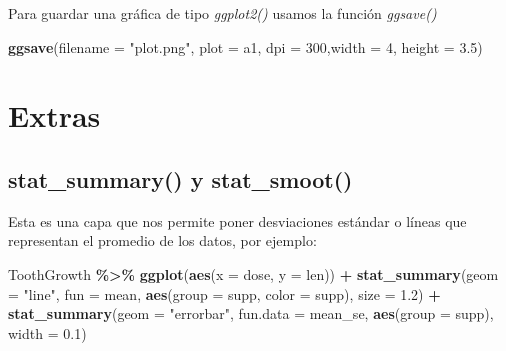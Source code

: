 \documentclass[
]{book}
\newenvironment{Shaded}{\begin{snugshade}}{\end{snugshade}}
\newcommand{\AttributeTok}[1]{\textcolor[rgb]{0.13,0.29,0.53}{#1}}
\newcommand{\DecValTok}[1]{\textcolor[rgb]{0.00,0.00,0.81}{#1}}
\newcommand{\FloatTok}[1]{\textcolor[rgb]{0.00,0.00,0.81}{#1}}
\newcommand{\FunctionTok}[1]{\textcolor[rgb]{0.13,0.29,0.53}{\textbf{#1}}}
\newcommand{\NormalTok}[1]{#1}
\newcommand{\SpecialCharTok}[1]{\textcolor[rgb]{0.81,0.36,0.00}{\textbf{#1}}}
\newcommand{\StringTok}[1]{\textcolor[rgb]{0.31,0.60,0.02}{#1}}
\begin{document}
Para guardar una gráfica de tipo \emph{ggplot2()} usamos la función \emph{ggsave()}

\begin{Shaded}
\begin{Highlighting}[]
\FunctionTok{ggsave}\NormalTok{(}\AttributeTok{filename =} \StringTok{"plot.png"}\NormalTok{, }\AttributeTok{plot =}\NormalTok{ a1, }\AttributeTok{dpi =} \DecValTok{300}\NormalTok{,}\AttributeTok{width =} \DecValTok{4}\NormalTok{, }\AttributeTok{height =} \FloatTok{3.5}\NormalTok{)}
\end{Highlighting}
\end{Shaded}

\section{Extras}\label{extras}

\subsection{stat\_summary() y stat\_smoot()}\label{stat_summary-y-stat_smoot}

Esta es una capa que nos permite poner desviaciones estándar o líneas que representan el promedio de los datos, por ejemplo:

\begin{Shaded}
\begin{Highlighting}[]
\NormalTok{ToothGrowth }\SpecialCharTok{\%\textgreater{}\%} 
  \FunctionTok{ggplot}\NormalTok{(}\FunctionTok{aes}\NormalTok{(}\AttributeTok{x =}\NormalTok{ dose, }\AttributeTok{y =}\NormalTok{ len)) }\SpecialCharTok{+}
  \FunctionTok{stat\_summary}\NormalTok{(}\AttributeTok{geom =} \StringTok{"line"}\NormalTok{, }\AttributeTok{fun =}\NormalTok{ mean, }\FunctionTok{aes}\NormalTok{(}\AttributeTok{group =}\NormalTok{ supp, }\AttributeTok{color =}\NormalTok{ supp), }\AttributeTok{size =} \FloatTok{1.2}\NormalTok{) }\SpecialCharTok{+} 
  \FunctionTok{stat\_summary}\NormalTok{(}\AttributeTok{geom =} \StringTok{"errorbar"}\NormalTok{, }\AttributeTok{fun.data =}\NormalTok{ mean\_se, }\FunctionTok{aes}\NormalTok{(}\AttributeTok{group =}\NormalTok{ supp), }\AttributeTok{width =} \FloatTok{0.1}\NormalTok{)}
\end{Highlighting}
\end{Shaded}
\end{document}
